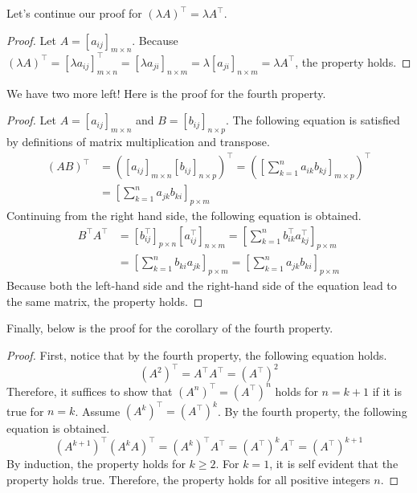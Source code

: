 \documentclass[../main.tex]{subfiles}
\begin{document}
Let's continue our proof for $(\lambda A)^\intercal =
\lambda A^\intercal$.

\begin{proof}
Let $A = [a_{ij}]_{m \times n}$. Because
$(\lambda A)^\intercal
= [\lambda a_{ij}]_{m \times n}^\intercal
= [\lambda a_{ji}]_{n \times m}
= \lambda [a_{ji}]_{n \times m}
= \lambda A^\intercal$, the property holds.
\end{proof}

We have two more left! Here is the proof for the fourth property.

\begin{proof}
Let $A = [a_{ij}]_{m \times n}$ and $B = [b_{ij}]_{n \times p}$.
The following equation is satisfied by definitions of matrix
multiplication and transpose.
\begin{align*}
    (AB)^\intercal
    &= \left(
        [a_{ij}]_{m \times n} [b_{ij}]_{n \times p}
    \right)^\intercal
    = \left(
        \left[ \sum_{k = 1}^{n} a_{ik} b_{kj} \right]_{m \times p}
    \right)^\intercal \\
    &= \left[ \sum_{k = 1}^{n} a_{jk} b_{ki} \right]_{p \times m}
\end{align*}
Continuing from the right hand side, the following equation is
obtained.
\begin{align*}
    B^\intercal A^\intercal
    &= \left[ b_{ij}^\intercal \right]_{p \times n}
        \left[ a_{ij}^\intercal \right]_{n \times m}
    = \left[
        \sum_{k = 1}^{n} b_{ik}^\intercal a_{kj}^\intercal
    \right]_{p \times m} \\
    &= \left[ \sum_{k = 1}^{n} b_{ki} a_{jk} \right]_{p \times m}
    = \left[ \sum_{k = 1}^{n} a_{jk} b_{ki} \right]_{p \times m}
\end{align*}
Because both the left-hand side and the right-hand side of the
equation lead to the same matrix, the property holds.
\end{proof}

Finally, below is the proof for the corollary of the fourth property.

\begin{proof}
First, notice that by the fourth property, the following equation
holds.
\[
\left( A^2 \right)^\intercal
= A^\intercal A^\intercal
= \left( A^\intercal \right)^2
\]
Therefore, it suffices to show that $(A^n)^\intercal =
(A^\intercal)^n$ holds for $n = k + 1$ if it is true for $n = k$.
Assume $(A^k)^\intercal = (A^\intercal)^k$. By the fourth property,
the following equation is obtained.
\[
\left( A^{k+1} \right)^\intercal
(A^k A)^\intercal
= (A^k)^\intercal A^\intercal
= (A^\intercal)^k A^\intercal
= (A^\intercal)^{k + 1}
\]
By induction, the property holds for $k \geq 2$. For $k = 1$,
it is self evident that the property holds true. Therefore, the
property holds for all positive integers $n$.
\end{proof}
\end{document}
